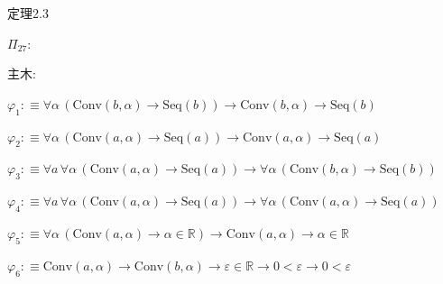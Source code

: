 \begin{fullproof}{定理2.3}
\begin{ptree}
\end{ptree}
\noindent$\Pi_{27}$:
\begin{ptree}
\noLine
{}
\end{ptree}
\noindent 主木:
\begin{ptree}
\noLine
{}
\noLine
{}
\noLine
{}
\end{ptree}
\begin{abbrevlist}
\item $\varphi_{1} :\equiv \forall \alpha\,(\mathrm{Conv}(b,\alpha) \to \mathrm{Seq}(b)) \to \mathrm{Conv}(b,\alpha) \to \mathrm{Seq}(b)$
\item $\varphi_{2} :\equiv \forall \alpha\,(\mathrm{Conv}(a,\alpha) \to \mathrm{Seq}(a)) \to \mathrm{Conv}(a,\alpha) \to \mathrm{Seq}(a)$
\item $\varphi_{3} :\equiv \forall a\,\forall \alpha\,(\mathrm{Conv}(a,\alpha) \to \mathrm{Seq}(a)) \to \forall \alpha\,(\mathrm{Conv}(b,\alpha) \to \mathrm{Seq}(b))$
\item $\varphi_{4} :\equiv \forall a\,\forall \alpha\,(\mathrm{Conv}(a,\alpha) \to \mathrm{Seq}(a)) \to \forall \alpha\,(\mathrm{Conv}(a,\alpha) \to \mathrm{Seq}(a))$
\item $\varphi_{5} :\equiv \forall \alpha\,(\mathrm{Conv}(a,\alpha) \to \alpha \in \mathbb{R}) \to \mathrm{Conv}(a,\alpha) \to \alpha \in \mathbb{R}$
\item $\varphi_{6} :\equiv \mathrm{Conv}(a,\alpha) \to \mathrm{Conv}(b,\alpha) \to \varepsilon \in \mathbb{R} \to 0 < \varepsilon \to 0 < \varepsilon$

\end{abbrevlist}
\end{fullproof}

